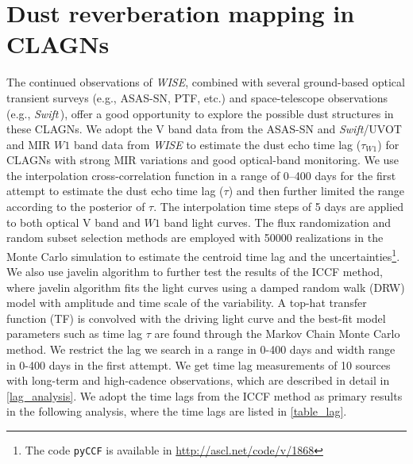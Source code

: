 \documentclass[linenumbers]{aastex631}
\newcommand{\swift}{{\small \it Swift}}
\newcommand{\uvot}{{\small {\it Swift}/UVOT}}
\begin{document}
\section{Dust reverberation mapping in CLAGNs}\label{sec:tau-L}
The continued observations of {\it WISE}, combined with several ground-based optical transient surveys (e.g., ASAS-SN, PTF, etc.) and space-telescope observations (e.g., \swift\,), offer a good opportunity to explore the possible dust structures in these CLAGNs. We adopt the V band data from the ASAS-SN \citep[All-sky Automated Survey for Supernovae,][]{2014ApJ...788...48S,2017PASP..129j4502K,2019MNRAS.485..961J} and \uvot\, and MIR $W1$ band data from {\it WISE} to estimate the dust echo time lag ($\tau_{W1}$) for {\color{red}CLAGNs with strong MIR variations and good optical-band monitoring}. We use the interpolation cross-correlation function \citep[ICCF;][]{1998PASP..110..660P,2018ascl.soft05032S} in a range of 0--400 days for the first attempt to estimate the dust echo time lag ($\tau$) and then further limited the range according to the posterior of $\tau$. The interpolation time steps of 5 days are applied to both optical V band and $W1$ band light curves. The flux randomization and random subset selection methods are employed with 50000 realizations in the Monte Carlo simulation to estimate the centroid time lag and the uncertainties\footnote{The code \texttt{pyCCF} is available in \url{http://ascl.net/code/v/1868}}. We also use {\sc javelin} algorithm to further test the results of the ICCF method, where {\sc javelin} algorithm fits the light curves using a damped random walk (DRW) model with amplitude and time scale of the variability. A top-hat transfer function (TF) is convolved with the driving light curve and the best-fit model parameters such as time lag $\tau$ are found through the Markov Chain Monte Carlo method. We restrict the lag we search in a range in 0-400 days and width range in 0-400 days in the first attempt. We get time lag measurements of 10 sources with long-term and high-cadence observations, which are described in detail in \autoref{lag_analysis}. We adopt the time lags from the ICCF method as primary results in the following analysis, where the time lags are listed in \autoref{table_lag}. 

\end{document}
